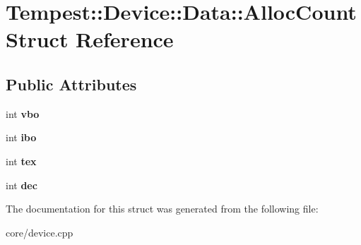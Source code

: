 \hypertarget{struct_device_1_1_data_1_1_alloc_count}{\section{Tempest\+:\+:Device\+:\+:Data\+:\+:Alloc\+Count Struct Reference}
\label{struct_device_1_1_data_1_1_alloc_count}
}
\subsection*{Public Attributes}
\begin{DoxyCompactItemize}
\item 
\hypertarget{struct_device_1_1_data_1_1_alloc_count_a80208c61a3e076167b4ab4317a97e8a9}{int {\bfseries vbo}}\label{struct_device_1_1_data_1_1_alloc_count_a80208c61a3e076167b4ab4317a97e8a9}

\item 
\hypertarget{struct_device_1_1_data_1_1_alloc_count_a78ce71976ab948ffcb91fbc9370fd57f}{int {\bfseries ibo}}\label{struct_device_1_1_data_1_1_alloc_count_a78ce71976ab948ffcb91fbc9370fd57f}

\item 
\hypertarget{struct_device_1_1_data_1_1_alloc_count_a68ba875dd2170e89247011435a5cda5c}{int {\bfseries tex}}\label{struct_device_1_1_data_1_1_alloc_count_a68ba875dd2170e89247011435a5cda5c}

\item 
\hypertarget{struct_device_1_1_data_1_1_alloc_count_a1d2309fdf3a6f860e8554652df8140f4}{int {\bfseries dec}}\label{struct_device_1_1_data_1_1_alloc_count_a1d2309fdf3a6f860e8554652df8140f4}

\end{DoxyCompactItemize}


The documentation for this struct was generated from the following file\+:\begin{DoxyCompactItemize}
\item 
core/device.\+cpp\end{DoxyCompactItemize}

